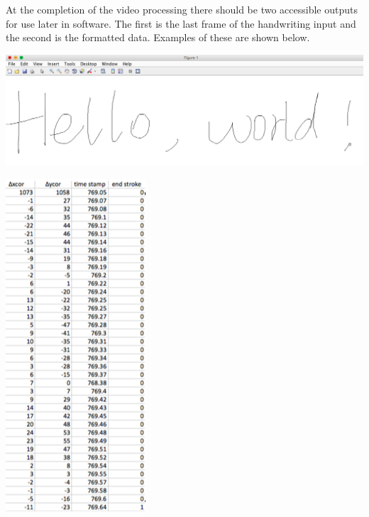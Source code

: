 \documentclass{article} %
\begin{document}
At the completion of the video processing there should be two accessible outputs for use later in software. The first is the last frame of the handwriting input and the second is the formatted data. Examples of these are shown below. 
\begin{center}
\includegraphics[scale = 0.2]{Hello_world.png}
\end{center}
\begin{center}
\includegraphics[scale = 0.7]{Collected_Data.png}
\end{center}
\end{document}

